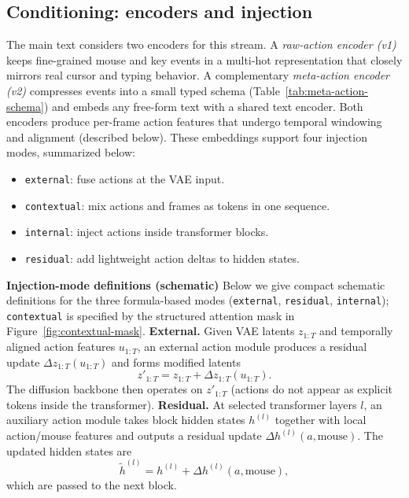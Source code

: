\subsection{Conditioning: encoders and injection}
The main text considers two encoders for this stream.
A \emph{raw-action encoder (v1)} keeps fine-grained mouse and key events in a multi-hot representation that closely mirrors real cursor and typing behavior.
A complementary \emph{meta-action encoder (v2)} compresses events into a small typed schema (Table~\ref{tab:meta-action-schema}) and embeds any free-form text with a shared text encoder.
Both encoders produce per-frame action features that undergo temporal windowing and alignment (described below).
These embeddings support four injection modes, summarized below:
\begin{tcolorbox}[
  colback=metablue!8,
  colframe=metablue!40,
  boxrule=0pt,
  borderline west={1pt}{0pt}{gray!60},
  left=6pt,right=4pt,top=3pt,bottom=3pt]
\small
\begin{itemize}
  \setlength{\itemsep}{2pt}
  \setlength{\topsep}{2pt}
  \item \texttt{external}: fuse actions at the VAE input.
  \item \texttt{contextual}: mix actions and frames as tokens in one sequence.
  \item \texttt{internal}: inject actions inside transformer blocks.
  \item \texttt{residual}: add lightweight action deltas to hidden states.
\end{itemize}
\end{tcolorbox}

\noindent\textbf{Injection-mode definitions (schematic)}
\label{appendix:gui-injection-equations}
Below we give compact schematic definitions for the three formula-based modes (\texttt{external}, \texttt{residual}, \texttt{internal}); \texttt{contextual} is specified by the structured attention mask in Figure~\ref{fig:contextual-mask}.
%
\textbf{External.} Given VAE latents $z_{1:T}$ and temporally aligned action features $u_{1:T}$, an external action module produces a residual update $\Delta z_{1:T}(u_{1:T})$ and forms modified latents
\[
  z'_{1:T} = z_{1:T} + \Delta z_{1:T}(u_{1:T}).
\]
The diffusion backbone then operates on $z'_{1:T}$ (actions do not appear as explicit tokens inside the transformer).
%
\textbf{Residual.} At selected transformer layers $l$, an auxiliary action module takes block hidden states $h^{(l)}$ together with local action/mouse features and outputs a residual update $\Delta h^{(l)}(a,\text{mouse})$.
The updated hidden states are
\[
  \tilde{h}^{(l)} = h^{(l)} + \Delta h^{(l)}(a,\text{mouse}),
\]
which are passed to the next block.

